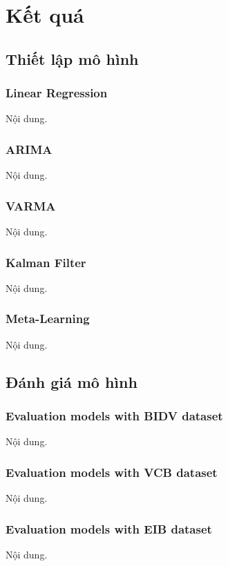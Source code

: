 \section{Kết quá}

\subsection{Thiết lập mô hình} 
\subsubsection{Linear Regression}
Nội dung.

\subsubsection{ARIMA}
Nội dung.

\subsubsection{VARMA}
Nội dung.

\subsubsection{Kalman Filter}
Nội dung.

\subsubsection{Meta-Learning}
Nội dung.

\subsection{Đánh giá mô hình} 
\subsubsection{Evaluation models with BIDV dataset}
Nội dung.

\subsubsection{Evaluation models with VCB dataset}
Nội dung.

\subsubsection{Evaluation models with EIB dataset}
Nội dung.

